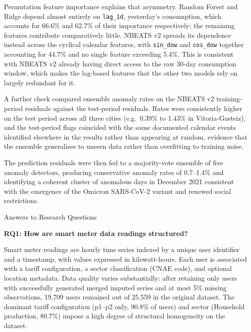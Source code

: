 ﻿\documentclass[12pt,reqno, twoside]{amsbook}
\makeatletter
\numberwithin{figure}{chapter}
\numberwithin{table}{chapter}
\numberwithin{equation}{chapter}
\def\section{\@startsection{section}{1}%
      \z@{.5\linespacing\@plus.7\linespacing}{.25\linespacing}%
      {\normalfont\bfseries\flushleft}}
\theoremstyle{plain}
\numberwithin{equation}{chapter}
\numberwithin{section}{chapter}
\makeatother
\begin{document}
Permutation feature importance explains that asymmetry. Random Forest and Ridge depend almost entirely on \texttt{lag\_1d}, yesterday's consumption, which accounts for 66.6\% and 62.7\% of their importance respectively; the remaining features contribute comparatively little. \ac{NBEATS} v2 spreads its dependence instead across the cyclical calendar features, with \texttt{sin\_dow} and \texttt{cos\_dow} together accounting for 44.7\% and no single feature exceeding 5.4\%. This is consistent with \ac{NBEATS} v2 already having direct access to the raw 30-day consumption window, which makes the lag-based features that the other two models rely on largely redundant for it.

A further check compared ensemble anomaly rates on the \ac{NBEATS} v2 training-period residuals against the test-period residuals. Rates were consistently higher on the test period across all three cities (e.g.\ 0.39\% to 1.43\% in Vitoria-Gasteiz), and the test-period flags coincided with the same documented calendar events identified elsewhere in the results rather than appearing at random, evidence that the ensemble generalises to unseen data rather than overfitting to training noise.

The prediction residuals were then fed to a majority-vote ensemble of five anomaly detectors, producing conservative anomaly rates of 0.7--1.4\% and identifying a coherent cluster of anomalous days in December 2021 consistent with the emergence of the Omicron SARS-CoV-2 variant and renewed social restrictions.

\section{Answers to Research Questions}

\noindent\textbf{RQ1: How are smart meter data readings structured?}

Smart meter readings are hourly time series indexed by a unique user identifier and a timestamp, with values expressed in kilowatt-hours. Each user is associated with a tariff configuration, a sector classification (\ac{CNAE} code), and optional location metadata. Data quality varies substantially: after retaining only users with successfully generated merged imputed series and at most 5\% missing observations, 19,709 users remained out of 25,559 in the original dataset. The dominant tariff configuration (p1--p2 only, 90.8\% of users) and sector (Household production, 80.7\%) impose a high degree of structural homogeneity on the dataset.
\end{document}
